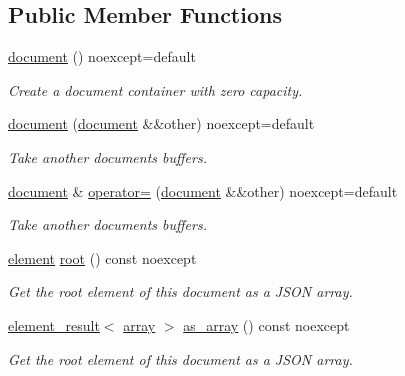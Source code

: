 \subsection*{Public Member Functions}
\begin{DoxyCompactItemize}
\item 
\hyperlink{classsimdjson_1_1document_ae567f14c4585f81011584d08d5b97323}{document} () noexcept=default
\begin{DoxyCompactList}\small\item\em Create a document container with zero capacity. \end{DoxyCompactList}\item 
\hyperlink{classsimdjson_1_1document_a4f548bb085c9cd0b2467a6539d651699}{document} (\hyperlink{classsimdjson_1_1document}{document} \&\&other) noexcept=default
\begin{DoxyCompactList}\small\item\em Take another document\textquotesingle{}s buffers. \end{DoxyCompactList}\item 
\hyperlink{classsimdjson_1_1document}{document} \& \hyperlink{classsimdjson_1_1document_af299e11bc22e27839e0ad25b5e7e867c}{operator=} (\hyperlink{classsimdjson_1_1document}{document} \&\&other) noexcept=default
\begin{DoxyCompactList}\small\item\em Take another document\textquotesingle{}s buffers. \end{DoxyCompactList}\item 
\mbox{\label{classsimdjson_1_1document_ad240c2d93c83c378e8220e667d0bdee2}} 
\hyperlink{classsimdjson_1_1document_1_1element}{element} \hyperlink{classsimdjson_1_1document_ad240c2d93c83c378e8220e667d0bdee2}{root} () const noexcept
\begin{DoxyCompactList}\small\item\em Get the root element of this document as a J\+S\+ON array. \end{DoxyCompactList}\item 
\mbox{\label{classsimdjson_1_1document_af1fbcf1d4d9b7c0672e386f32928ca6f}} 
\hyperlink{classsimdjson_1_1document_1_1element__result}{element\+\_\+result}$<$ \hyperlink{classsimdjson_1_1document_1_1array}{array} $>$ \hyperlink{classsimdjson_1_1document_af1fbcf1d4d9b7c0672e386f32928ca6f}{as\+\_\+array} () const noexcept
\begin{DoxyCompactList}\small\item\em Get the root element of this document as a J\+S\+ON array. \end{DoxyCompactList}\item 

\end{DoxyCompactItemize}
